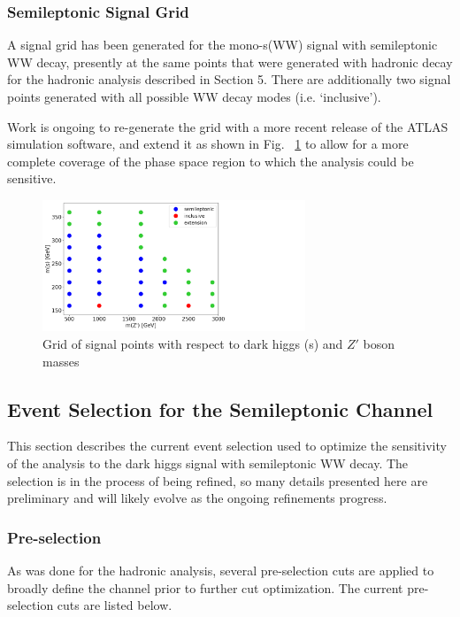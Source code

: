 \documentclass[12pt]{article}
\begin{document}
\subsubsection{Semileptonic Signal Grid}

A signal grid has been generated for the mono-s(WW) signal with semileptonic WW decay, presently at the same points that were generated with hadronic decay for the hadronic analysis described in Section 5. There are additionally two signal points generated with all possible WW decay modes (i.e. `inclusive'). 

Work is ongoing to re-generate the grid with a more recent release of the ATLAS simulation software, and extend it as shown in Fig. ~\ref{fig:signalgrid} to allow for a more complete coverage of the phase space region to which the analysis could be sensitive.

\begin{figure}[H]
	\centering
	\includegraphics[width=0.7\textwidth]{figures/SignalGrid_simple.png}
	\caption[]{Grid of signal points with respect to dark higgs (s) and $Z'$ boson masses}
	\label{fig:signalgrid}
\end{figure}

\subsection{Event Selection for the Semileptonic Channel}

This section describes the current event selection used to optimize the sensitivity of the analysis to the dark higgs signal with semileptonic WW decay. The selection is in the process of being refined, so many details presented here are preliminary and will likely evolve as the ongoing refinements progress. 

\subsubsection{Pre-selection}

As was done for the hadronic analysis, several pre-selection cuts are applied to broadly define the channel prior to further cut optimization. The current pre-selection cuts are listed below.
\end{document}
